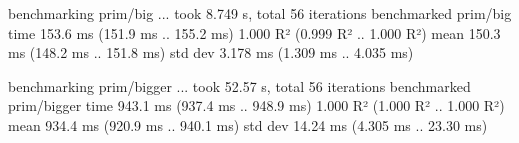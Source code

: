 \documentclass[12pt, a4paper]{article}
\begin{document}
benchmarking prim/big ... took 8.749 s, total 56 iterations
benchmarked prim/big
time                 153.6 ms   (151.9 ms .. 155.2 ms)
                     1.000 R²   (0.999 R² .. 1.000 R²)
mean                 150.3 ms   (148.2 ms .. 151.8 ms)
std dev              3.178 ms   (1.309 ms .. 4.035 ms)

benchmarking prim/bigger ... took 52.57 s, total 56 iterations
benchmarked prim/bigger
time                 943.1 ms   (937.4 ms .. 948.9 ms)
                     1.000 R²   (1.000 R² .. 1.000 R²)
mean                 934.4 ms   (920.9 ms .. 940.1 ms)
std dev              14.24 ms   (4.305 ms .. 23.30 ms)

\end{document}
